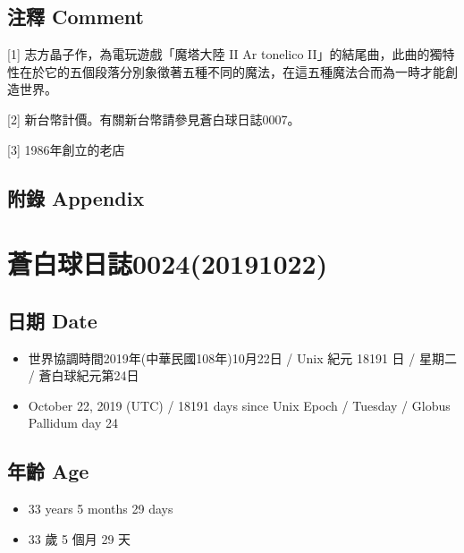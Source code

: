 \documentclass[a5paper, 12pt
]{book}
\providecommand{\tightlist}{%
  \setlength{\itemsep}{0pt}\setlength{\parskip}{0pt}}
\begin{document}
\hypertarget{ux6ce8ux91cb-comment-16}{%
\subsection{注釋 Comment}\label{ux6ce8ux91cb-comment-16}}

{[}1{]} 志方晶子作，為電玩遊戲「魔塔大陸 II Ar tonelico
II」的結尾曲，此曲的獨特性在於它的五個段落分別象徵著五種不同的魔法，在這五種魔法合而為一時才能創造世界。

{[}2{]} 新台幣計價。有關新台幣請參見蒼白球日誌0007。

{[}3{]} 1986年創立的老店

\hypertarget{ux9644ux9304-appendix-15}{%
\subsection{附錄 Appendix}\label{ux9644ux9304-appendix-15}}

\hypertarget{ux84bcux767dux7403ux65e5ux8a8c002420191022}{%
\section{蒼白球日誌0024(20191022)}\label{ux84bcux767dux7403ux65e5ux8a8c002420191022}}

\hypertarget{ux65e5ux671f-date-21}{%
\subsection{日期 Date}\label{ux65e5ux671f-date-21}}

\begin{itemize}
\tightlist
\item
  世界協調時間2019年(中華民國108年)10月22日 / Unix 紀元 18191 日 /
  星期二 / 蒼白球紀元第24日
\item
  October 22, 2019 (UTC) / 18191 days since Unix Epoch / Tuesday /
  Globus Pallidum day 24
\end{itemize}

\hypertarget{ux5e74ux9f61-age-21}{%
\subsection{年齡 Age}\label{ux5e74ux9f61-age-21}}

\begin{itemize}
\tightlist
\item
  33 years 5 months 29 days
\item
  33 歲 5 個月 29 天
\end{itemize}
\end{document}
